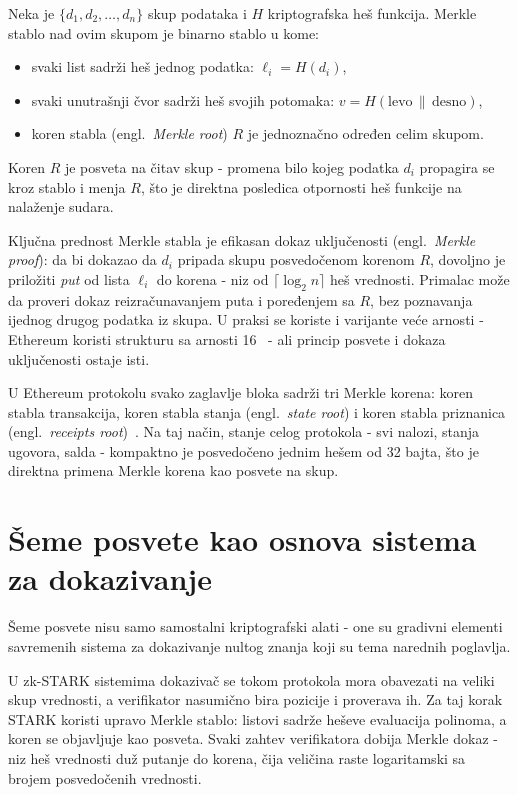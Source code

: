 \begin{definition}
\label{def:merkle-tree}
Neka je $\{d_1, d_2, \ldots, d_n\}$ skup podataka i $H$ kriptografska heš funkcija.
Merkle stablo nad ovim skupom je binarno stablo u kome:
\begin{itemize}
  \item svaki list sadrži heš jednog podatka: $\ell_i = H(d_i)$,
  \item svaki unutrašnji čvor sadrži heš svojih potomaka: $v = H(\text{levo} \,\|\, \text{desno})$,
  \item koren stabla (engl.\ \textit{Merkle root}) $R$ je jednoznačno određen celim skupom.
\end{itemize}
\end{definition}

Koren $R$ je posveta na čitav skup - promena bilo kojeg podatka $d_i$ propagira se kroz
stablo i menja $R$, što je direktna posledica otpornosti heš funkcije na nalaženje sudara.

Ključna prednost Merkle stabla je efikasan dokaz uključenosti
(engl.\ \textit{Merkle proof}): da bi dokazao da $d_i$ pripada skupu posvedočenom korenom
$R$, dovoljno je priložiti \emph{put} od lista $\ell_i$ do korena - niz od
$\lceil \log_2 n \rceil$ heš vrednosti. Primalac može da proveri dokaz reizračunavanjem
puta i poređenjem sa $R$, bez poznavanja ijednog drugog podatka iz skupa. U praksi se
koriste i varijante veće arnosti - Ethereum koristi strukturu sa arnosti 16~\cite{ethereumMPT} - ali princip
posvete i dokaza uključenosti ostaje isti.

U Ethereum protokolu svako zaglavlje bloka sadrži tri Merkle korena: koren stabla
transakcija, koren stabla stanja (engl.\ \textit{state root}) i koren stabla priznanica
(engl.\ \textit{receipts root})~\cite{wood2014ethereum}. Na taj način, stanje celog
protokola - svi nalozi, stanja ugovora, salda - kompaktno je posvedočeno jednim hešem
od 32 bajta, što je direktna primena Merkle korena kao posvete na skup.

\section{Šeme posvete kao osnova sistema za dokazivanje}
\label{sec:commitments-zk-bridge}

Šeme posvete nisu samo samostalni kriptografski alati - one su gradivni elementi
savremenih sistema za dokazivanje nultog znanja koji su tema narednih poglavlja.

U zk-STARK sistemima dokazivač se tokom protokola mora obavezati na veliki skup vrednosti,
a verifikator nasumično bira pozicije i proverava ih. Za taj korak STARK koristi upravo
Merkle stablo: listovi sadrže heševe evaluacija polinoma, a koren se objavljuje kao posveta.
Svaki zahtev verifikatora dobija Merkle dokaz - niz heš vrednosti duž putanje do korena,
čija veličina raste logaritamski sa brojem posvedočenih vrednosti.

